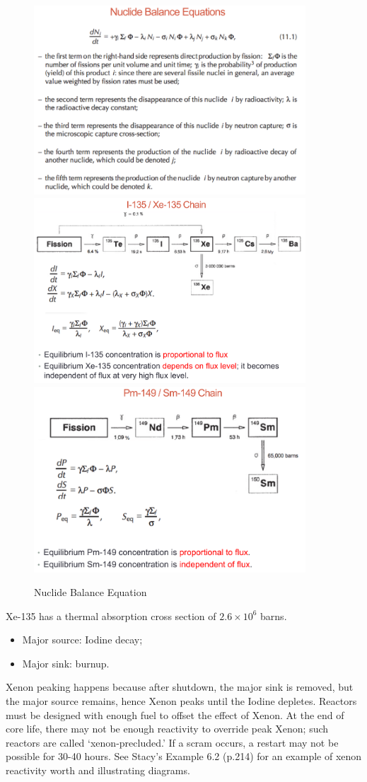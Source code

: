 \documentclass{school-22.211-notes}
\begin{document}
\clearpage
\begin{figure}[ht]
  \centering
  \includegraphics[width=4in]{images/dfs/nuclide-balance-equation.png}
  \includegraphics[width=4in]{images/dfs/I-Xe.png}
  \includegraphics[width=4in]{images/dfs/Pm-Sm.png}
  \caption{Nuclide Balance Equation} \label{nbe} 
\end{figure}



\clearpage
{} \label{FP-Xenon}
Xe-135 has a thermal absorption cross section of $2.6\times 10^6$ barns. 
\begin{itemize}
\item Major source: Iodine decay; 
\item Major sink: burnup. 
\end{itemize}
Xenon peaking happens because after shutdown, the major sink is removed, but the major source remains, hence Xenon peaks until the Iodine depletes. Reactors must be designed with enough fuel to offset the effect of Xenon. At the end of core life, there may not be enough reactivity to override peak Xenon; such reactors are called `xenon-precluded.' If a scram occurs, a restart may not be possible for 30-40 hours. See Stacy's Example 6.2 (p.214) for an example of xenon reactivity worth and illustrating diagrams. 
\end{document}
